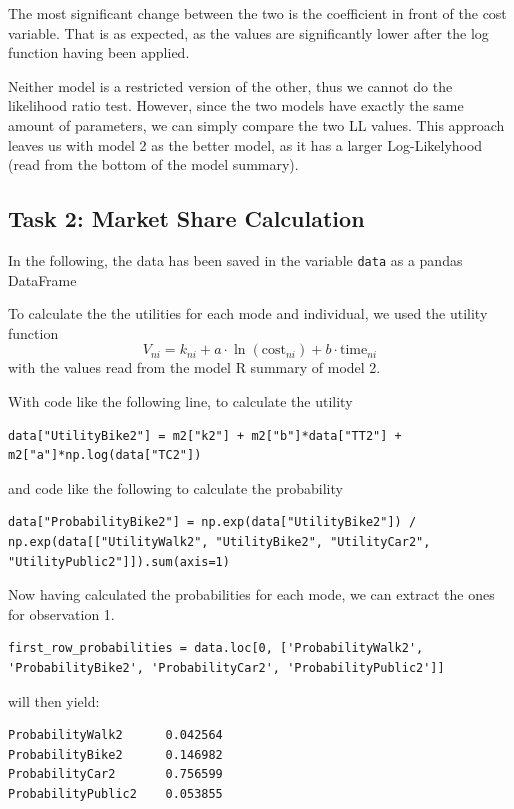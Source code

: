 \documentclass[a4paper,12pt]{article}
\begin{document}
The most significant change between the two is the coefficient in front of the cost variable. That is as expected, as the values are significantly lower after the log function having been applied.

Neither model is a restricted version of the other, thus we cannot do the likelihood ratio test. However, since the two models have exactly the same amount of parameters, we can simply compare the two LL values. This approach leaves us with model 2 as the better model, as it has a larger Log-Likelyhood (read from the bottom of the model summary).

\subsection{Task 2: Market Share Calculation}
In the following, the data has been saved in the variable \texttt{data} as a pandas DataFrame

To calculate the the utilities for each mode and individual, 
we used the utility function
$$
V_{ni} = k_{ni} + a\cdot \ln(\text{cost}_{ni}) + b \cdot \text{time}_{ni}
$$
with the values read from the model R summary of model 2.

With code like the following line, to calculate the utility
\begin{verbatim}
data["UtilityBike2"] = m2["k2"] + m2["b"]*data["TT2"] + m2["a"]*np.log(data["TC2"])
\end{verbatim}
and code like the following to calculate the probability
\begin{verbatim}
data["ProbabilityBike2"] = np.exp(data["UtilityBike2"]) / np.exp(data[["UtilityWalk2", "UtilityBike2", "UtilityCar2", "UtilityPublic2"]]).sum(axis=1)
\end{verbatim}

Now having calculated the probabilities for each mode, we can extract the ones for observation 1.
\begin{verbatim}
first_row_probabilities = data.loc[0, ['ProbabilityWalk2', 'ProbabilityBike2', 'ProbabilityCar2', 'ProbabilityPublic2']]
\end{verbatim}
will then yield:
\begin{verbatim}
ProbabilityWalk2      0.042564
ProbabilityBike2      0.146982
ProbabilityCar2       0.756599
ProbabilityPublic2    0.053855
\end{verbatim}
\end{document}
